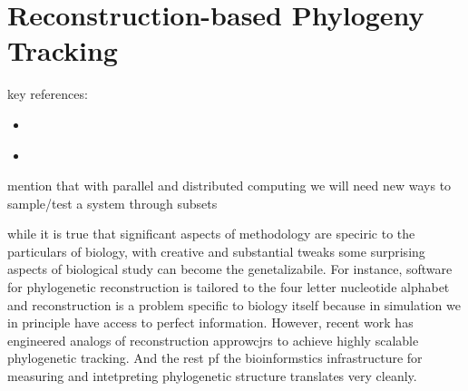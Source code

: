\section{Reconstruction-based Phylogeny Tracking}

key references:
\begin{itemize}
  \item \citep{moreno2022hstrat}
  \item \citep{moreno2024guide}
\end{itemize}

mention that with parallel and distributed computing we will need new ways to sample/test a system through subsets

while it is true that significant aspects of methodology are speciric to the particulars of biology, with creative and substantial tweaks some surprising aspects of biological study can become the genetalizabile.
For instance, software for phylogenetic reconstruction is tailored to the four letter nucleotide alphabet and reconstruction is a problem specific to biology itself because in simulation we in principle have access to perfect information.
However, recent work has engineered analogs of reconstruction approwcjrs to achieve highly scalable phylogenetic tracking.
And the rest pf the bioinformstics infrastructure for measuring and intetpreting phylogenetic structure translates very cleanly.
